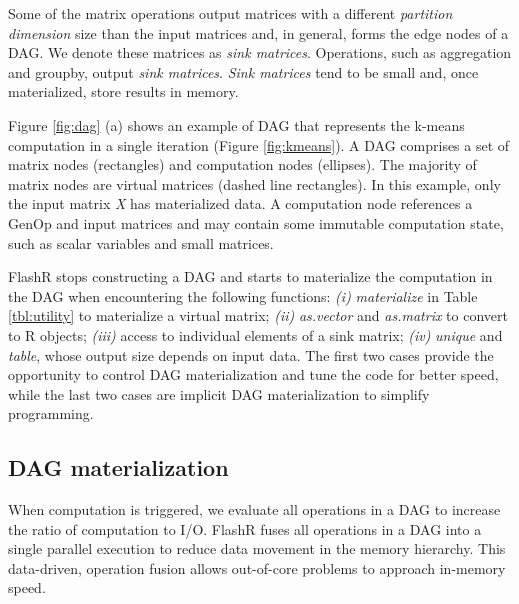 Some of the matrix operations output matrices with
a different \textit{partition dimension} size than the input matrices and,
in general, forms the edge nodes of a DAG. We denote these matrices as
\textit{sink matrices}. Operations, such as aggregation and groupby,
output \textit{sink matrices}. \textit{Sink matrices} tend to be small and,
once materialized, store results in memory.

Figure \ref{fig:dag} (a) shows an example of DAG that represents the k-means
computation in a single iteration (Figure \ref{fig:kmeans}).
A DAG comprises a set of
matrix nodes (rectangles) and computation nodes (ellipses). The majority of
matrix nodes are virtual matrices (dashed line rectangles).
In this example, only the input matrix \textit{X} has materialized data.
A computation node references a GenOp and input matrices and
may contain some immutable computation state, such as scalar variables and
small matrices. 

FlashR stops constructing a DAG and starts to materialize the computation
in the DAG when encountering the following functions: \textit{(i)}
\textit{materialize}
in Table \ref{tbl:utility} to materialize a virtual matrix;
\textit{(ii)} \textit{as.vector} and \textit{as.matrix} to convert
to R objects; \textit{(iii)} access to individual elements of a sink matrix;
\textit{(iv)} \textit{unique} and \textit{table},
whose output size depends on input data. The first two cases
provide the opportunity to control DAG materialization and tune
the code for better speed, while the last two cases are
implicit DAG materialization to simplify programming.

\subsection{DAG materialization}\label{sec:materialize}
When computation is triggered, we evaluate all operations in a DAG
to increase the ratio of computation to I/O. FlashR fuses all operations in
a DAG into a single parallel execution to reduce data
movement in the memory hierarchy. This data-driven,
operation fusion allows out-of-core problems to approach in-memory speed.

